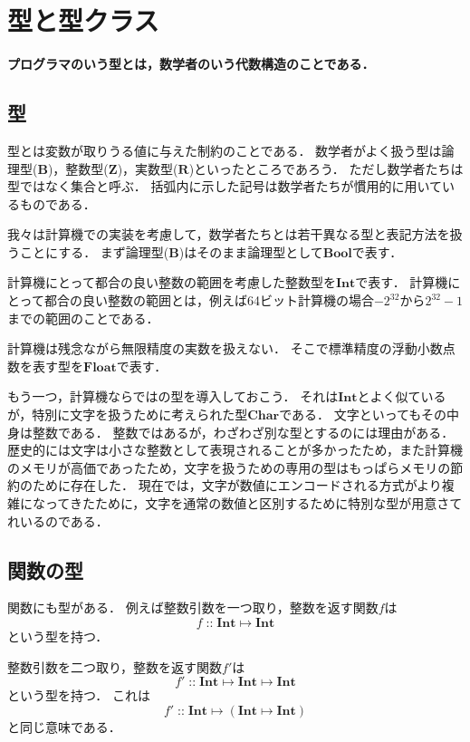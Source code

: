\documentclass[twocolumn]{jsbook}
\newenvironment{leader}{\begingroup\bf}{\endgroup}
\newcommand{\typename}[1]{\mathbf{#1}}
\newcommand{\typebool}{\typename{Bool}}
\newcommand{\typechar}{\typename{Char}}
\newcommand{\typeint}{\typename{Int}}
\newcommand{\typefloat}{\typename{Float}}
\newcommand{\morph}[2]{#1\mapsto#2}
\newcommand{\mmorph}[3]{#1\mapsto#2\mapsto#3}
\newcommand{\mmorphwithparenthesis}[3]{#1\mapsto(#2\mapsto#3)}
\newcommand{\istypeof}{\mathop{::}}
\newcommand{\mathsetname}[1]{\boldsymbol{#1}}
\begin{document}
\chapter{型と型クラス}

\begin{leader}
プログラマのいう型とは，数学者のいう代数構造のことである．
\end{leader}


\section{型}

型とは変数が取りうる値に与えた制約のことである．
数学者がよく扱う型は論理型($\mathsetname{B}$)，整数型($\mathsetname{Z}$)，実数型($\mathsetname{R}$)といったところであろう．
ただし数学者たちは型ではなく集合と呼ぶ．
括弧内に示した記号は数学者たちが慣用的に用いているものである．

我々は計算機での実装を考慮して，数学者たちとは若干異なる型と表記方法を扱うことにする．
まず論理型($\mathsetname{B}$)はそのまま論理型として$\typebool$で表す．

計算機にとって都合の良い整数の範囲を考慮した整数型を$\typeint$で表す．
計算機にとって都合の良い整数の範囲とは，例えば64ビット計算機の場合$-2^{32}$から$2^{32}-1$までの範囲のことである．

計算機は残念ながら無限精度の実数を扱えない．
そこで標準精度の浮動小数点数を表す型を$\typefloat$で表す．

もう一つ，計算機ならではの型を導入しておこう．
それは$\typeint$とよく似ているが，特別に文字を扱うために考えられた型$\typechar$である．
文字といってもその中身は整数である．
整数ではあるが，わざわざ別な型とするのには理由がある．
歴史的には文字は小さな整数として表現されることが多かったため，また計算機のメモリが高価であったため，文字を扱うための専用の型はもっぱらメモリの節約のために存在した．
現在では，文字が数値にエンコードされる方式がより複雑になってきたために，文字を通常の数値と区別するために特別な型が用意さてれいるのである．


\section{関数の型}

関数にも型がある．
例えば整数引数を一つ取り，整数を返す関数$f$は$$f\istypeof\morph{\typeint}{\typeint}$$という型を持つ．

整数引数を二つ取り，整数を返す関数$f'$は$$f'\istypeof\mmorph{\typeint}{\typeint}{\typeint}$$という型を持つ．
これは$$f'\istypeof\mmorphwithparenthesis{\typeint}{\typeint}{\typeint}$$と同じ意味である．
\end{document}
